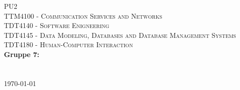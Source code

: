 \begin{titlepage}
\begin{center} 

\vspace*{3cm}
\textsc{\Huge PU2}\\[0.7cm]
\textsc{\medium TTM4100 - Communication Services and Networks}\\[0.3cm]
\textsc{\medium TDT4140 - Software Enigneering}\\[0.3cm]
\textsc{\medium TDT4145 - Data Modeling, Databases and Database Management Systems}\\[0.3cm]
\textsc{\medium TDT4180 - Human-Computer Interaction}\\[0.3cm]

\textbf{\Large Gruppe 7:} \\[0.2cm]
 \\
\\[1cm] 

\today

\end{center}
\end{titlepage}
